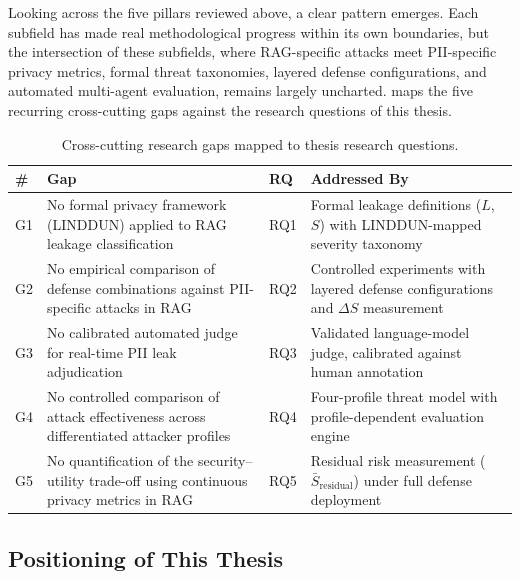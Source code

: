 \documentclass[12pt,a4paper]{report}
\begin{document}
Looking across the five pillars reviewed above, a clear pattern emerges. Each subfield has made real methodological progress within its own boundaries, but the intersection of these subfields, where RAG-specific attacks meet PII-specific privacy metrics, formal threat taxonomies, layered defense configurations, and automated multi-agent evaluation, remains largely uncharted.  maps the five recurring cross-cutting gaps against the research questions of this thesis.

\begin{table}[H]
\centering
\caption{Cross-cutting research gaps mapped to thesis research questions.}
\label{tab:gap-matrix}
\footnotesize

\begin{tabular}{C{0.5cm}W{6.5cm}C{1.2cm}W{4.5cm}}
\toprule

\textbf{\#} &
\textbf{Gap} &
\textbf{RQ} &
\textbf{Addressed By} \\
\midrule
G1 & No formal privacy framework (LINDDUN) applied to RAG leakage classification & RQ1 & Formal leakage definitions ($L$, $S$) with LINDDUN-mapped severity taxonomy \\
G2 & No empirical comparison of defense combinations against PII-specific attacks in RAG & RQ2 & Controlled experiments with layered defense configurations and $\Delta S$ measurement \\
G3 & No calibrated automated judge for real-time PII leak adjudication & RQ3 & Validated language-model judge, calibrated against human annotation \\
G4 & No controlled comparison of attack effectiveness across differentiated attacker profiles & RQ4 & Four-profile threat model with profile-dependent evaluation engine \\
G5 & No quantification of the security--utility trade-off using continuous privacy metrics in RAG & RQ5 & Residual risk measurement ($\bar{S}_{\text{residual}}$) under full defense deployment \\
\bottomrule
\end{tabular}
\end{table}

\subsection{Positioning of This Thesis}
\end{document}
